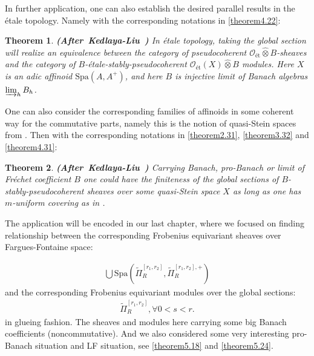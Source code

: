 \documentclass[12pt]{amsart}
\newtheorem{theorem}{Theorem}[section]
\theoremstyle{definition}
\numberwithin{equation}{section}
\begin{document}
\indent In further application, one can also establish the desired parallel results in the \'etale topology. Namely with the corresponding notations in \cref{theorem4.22}:


\begin{theorem}\mbox{\bf{(After Kedlaya-Liu \cite[Theorem 2.5.14]{KL2})}} In \'etale topology, taking the global section will realize an equivalence between the category of pseudocoherent $\mathcal{O}_\text{\'et}\widehat{\otimes} B$-sheaves and the category of $B$-\'etale-stably-pseudocoherent $\mathcal{O}_\text{\'et}(X)\widehat{\otimes}B$ modules. Here $X$ is an adic affinoid $\mathrm{Spa}(A,A^+)$, and here $B$ is injective limit of Banach algebras $\varinjlim_h B_h$.  
	
\end{theorem}



\indent One can also consider the corresponding families of affinoids in some coherent way for the commutative parts, namely this is the notion of quasi-Stein spaces from \cite[Chapter 2.6]{KL2}. Then with the corresponding notations in \cref{theorem2.31}, \cref{theorem3.32} and \cref{theorem4.31}:


\begin{theorem}\mbox{\bf{(After Kedlaya-Liu \cite[Proposition 2.6.17]{KL2})}} Carrying Banach, pro-Banach or limit of Fr\'echet coefficient $B$ one could have the finiteness of the global sections of $B$-stably-pseudocoherent sheaves over some quasi-Stein space $X$ as long as one has $m$-uniform covering as in \cite[Proposition 2.6.17]{KL2}.  
	
\end{theorem}



\indent The application will be encoded in our last chapter, where we focused on finding relationship between the corresponding Frobenius equivariant sheaves over Fargues-Fontaine space:

\begin{align}
\bigcup \mathrm{Spa}(\widetilde{\Pi}_R^{[r_1,r_2]},\widetilde{\Pi}_R^{[r_1,r_2],+})	
\end{align}
and the corresponding Frobenius equivariant modules over the global sections:
\begin{align}
\widetilde{\Pi}_R^{[r_1,r_2]},\forall 0<s<r.	
\end{align}
in glueing fashion. The sheaves and modules here carrying some big Banach coefficients (noncommutative). And we also considered some very interesting pro-Banach situation and LF situation, see \cref{theorem5.18} and \cref{theorem5.24}.\\ 
\end{document}
